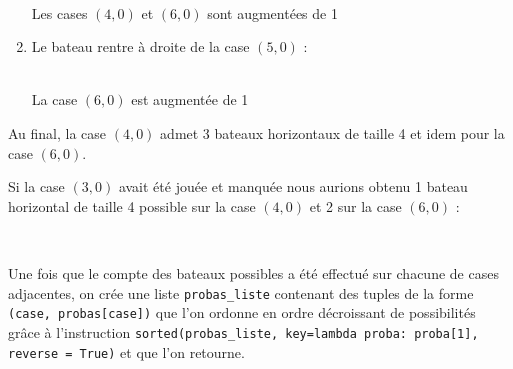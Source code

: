\begin{enumerate}
\begin{center}
\\
Les cases $(4,0)$ et $(6,0)$ sont augmentées de 1
\end{center}

\item Le bateau rentre à droite de la case $(5,0)$ :

\begin{center}
\\
La case $(6,0)$ est augmentée de 1
\end{center}
\end{enumerate} 
Au final, la case $(4,0)$ admet 3 bateaux horizontaux de taille 4 et idem pour la case $(6,0)$.

Si la case $(3,0)$ avait été jouée et manquée nous aurions obtenu 1 bateau horizontal de taille 4 possible sur la case $(4,0)$ et 2 sur la case $(6,0)$ :

\begin{center}
\\
\end{center}

Une fois que le compte des bateaux possibles a été effectué sur chacune de cases adjacentes, on crée une liste \texttt{probas\_liste} contenant des tuples de la forme \texttt{(case, probas[case])} que l'on ordonne en ordre décroissant de possibilités grâce à l'instruction \texttt{sorted(probas\_liste, key=lambda proba: proba[1], reverse = True)} et que l'on retourne.

